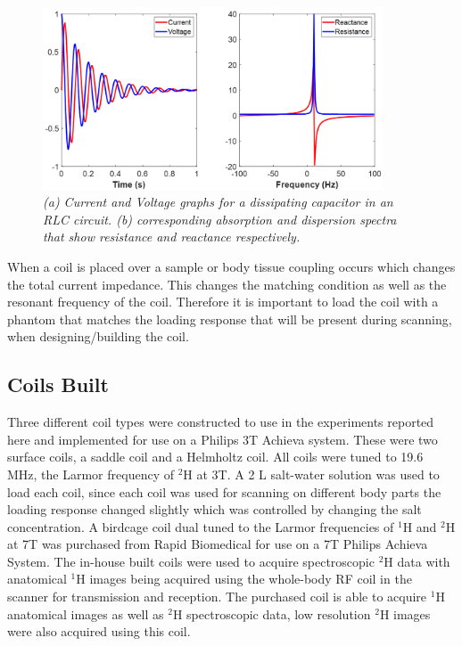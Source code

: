 \begin{figure}
    \centering
    \includegraphics[width=0.9\textwidth]{Figures/Theory/VI.png}
    \caption{\textit{(a) Current and Voltage graphs for a dissipating capacitor in an RLC circuit. (b) corresponding absorption and dispersion spectra that show resistance and reactance respectively.}}
    \label{fig:theory:VI}
\end{figure}

When a coil is placed over a sample or body tissue coupling occurs which changes the total current impedance. This changes the matching condition as well as the resonant frequency of the coil. Therefore it is important to load the coil with a phantom that matches the loading response that will be present during scanning, when designing/building the coil. 

\subsection{Coils Built}

Three different coil types were constructed to use in the experiments reported here and implemented for use on a Philips 3T Achieva system. These were two surface coils, a saddle coil and a Helmholtz coil. All coils were tuned to 19.6 MHz, the Larmor frequency of $^2$H at 3T. A 2 L salt-water solution was used to load each coil, since each coil was used for scanning on different body parts the loading response changed slightly which was controlled by changing the salt concentration. A birdcage coil dual tuned to the Larmor frequencies of $^1$H and $^2$H at 7T was purchased from Rapid Biomedical for use on a 7T Philips Achieva System. The in-house built coils were used to acquire spectroscopic $^2$H data with anatomical $^1$H images being acquired using the whole-body \ac{RF} coil in the scanner for transmission and reception. The purchased coil is able to acquire $^1$H anatomical images as well as $^2$H spectroscopic data, low resolution $^2$H images were also acquired using this coil.


